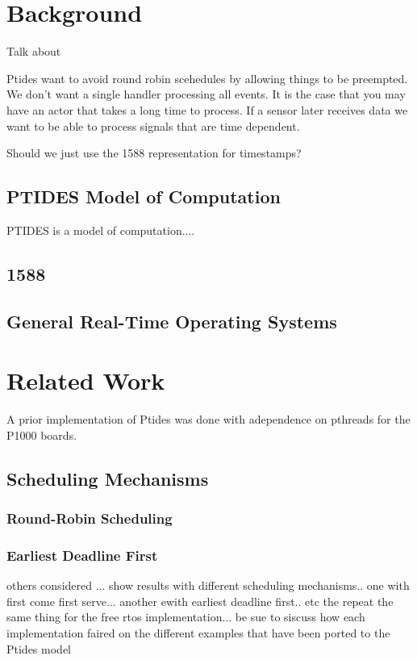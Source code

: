 \documentclass{sig-alternate}
\begin{document}
\section{Background}
Talk about 

Ptides want to avoid round robin scehedules by allowing things to be preempted. We don't want a single handler processing all events. It is the case that you may have an actor that takes a long time to process. If a sensor later receives data we want to be able to process signals that are time dependent.

Should we just use the 1588 representation for timestamps?

\subsection{PTIDES Model of Computation}
PTIDES is a \cite{ptidesTechReport} model of computation....

\subsection{1588}
\subsection{General Real-Time Operating Systems}



\section{Related Work}
A prior implementation of Ptides was done with adependence on pthreads for the P1000 boards.

\subsection{Scheduling Mechanisms}
\subsubsection{Round-Robin Scheduling}
\subsubsection{Earliest Deadline First}


others considered ... show results with different scheduling mechanisms.. one with first come first serve... another ewith earliest deadline first.. etc
the repeat the same thing for the free rtos implementation...
be sue to siscuss how each implementation faired on the different examples that have been ported to the Ptides model
\end{document}
